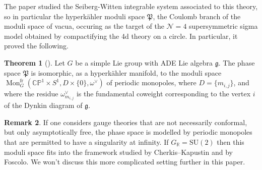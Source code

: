 \documentclass[11pt, oneside, reqno]{amsart}
\theoremstyle{definition} \newtheorem{definition}{Definition}[section]
\newtheorem{theorem}[definition]{Theorem}
\theoremstyle{definition} \newtheorem{remark}[definition]{Remark}
\theoremstyle{definition} \newtheorem{remarks}[definition]{Remarks}
\theoremstyle{definition} \newtheorem{question}[definition]{Question}
\theoremstyle{definition} \newtheorem*{note}{Note}
\theoremstyle{definition} \newtheorem{example}[definition]{Example}
\theoremstyle{definition} \newtheorem{examples}[definition]{Examples}
\renewcommand{\gg}{\mathfrak{g}}
\newcommand{\bb}[1]{\mathbb{#1}}
\newcommand{\mc}[1]{\mathcal{#1}}
\newcommand{\mf}[1]{\mathfrak{#1}}
\newcommand{\RR}{\mathbb{R}}
\newcommand{\SU}{\mathrm{SU}}
\DeclareMathOperator{\mon}{Mon}
\newcommand{\fr}{\mathrm{fr}}
\begin{document}
The paper \cite{NekrasovPestun} studied the Seiberg-Witten integrable system associated to this theory, so in particular the hyperk\"ahler moduli space $\mf P$, the Coulomb branch of the moduli space of vacua,  occuring as the target of the $\mc N=4$ supersymmetric sigma model obtained by compactifying the 4d theory on a circle.  In particular, it proved the following.

\begin{theorem}[{\cite[Section 8.1]{NekrasovPestun}}]
Let $G$ be a simple Lie group with ADE Lie algebra $\gg$.  The phase space $\mf P$ is isomorphic, as a hyperk\"ahler manifold, to the moduli space $\mon_G^\fr(\bb{CP}^1 \times S^1,D \times\{0\},\omega^\vee)$ of periodic monopoles, where $D = \{m_{i,j}\}$, and where the residue $\omega^\vee_{m_{i,j}}$ is the fundamental coweight corresponding to the vertex $i$ of the Dynkin diagram of $\gg$.
\end{theorem}

\begin{remark}
If one considers gauge theories that are not necessarily conformal, but only asymptotically free, the phase space is modelled by periodic monopoles that are permitted to have a singularity at infinity.  If $G_\RR = \SU(2)$ then this moduli space fits into the framework studied by Cherkis--Kapustin and by Foscolo.  We won't discuss this more complicated setting further in this paper.
\end{remark}
\end{document}
